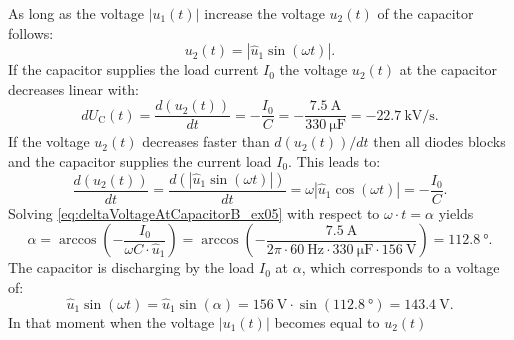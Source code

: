 \begin{solutionblock}
    As long as the voltage $\left| u_\mathrm{1}(t) \right|$ increase the voltage $u_\mathrm{2}(t)$ of the capacitor follows:
    \begin{equation} 
        u_\mathrm{2}(t) = \left| \hat{u}_\mathrm{1}\sin(\omega t)\right|.
    \end{equation}
    If the capacitor supplies the load current $I_\mathrm{0}$ the voltage $u_\mathrm{2}(t)$ at the capacitor 
    decreases linear with:
    \begin{equation} 
        dU_\mathrm{C}(t)=\frac{d(u_\mathrm{2}(t))}{dt} = -\frac{I_\mathrm{0}}{C}=-\frac{\SI{7.5}{\ampere}}{\SI{330}{\micro\farad}}
        =-\SI{22.7}{\kilo\volt/\second}.
        \label{eq:deltaVoltageAtCapacitorA_ex05}
    \end{equation} 
    If the voltage $u_\mathrm{2}(t)$ decreases faster than $d(u_\mathrm{2}(t))/dt$
    then all diodes blocks and the capacitor supplies the current load $I_\mathrm{0}$. This leads to:
    \begin{equation} 
        \frac{d(u_\mathrm{2}(t))}{dt} = \frac{d(\left| \hat{u}_\mathrm{1}\sin(\omega t)\right|)}{dt} 
        = \omega\left| \hat{u}_\mathrm{1}\cos(\omega t)\right| = -\frac{I_\mathrm{0}}{C}.
        \label{eq:deltaVoltageAtCapacitorB_ex05}
    \end{equation} 
    Solving \eqref{eq:deltaVoltageAtCapacitorB_ex05} with respect to $\omega \cdot t = \alpha$ yields
    \begin{equation}
        \alpha = \arccos(-\frac{I_\mathrm{0}}{\omega C \cdot \hat{u}_\mathrm{1}})
        = \arccos(-\frac{\SI{7.5}{\ampere}}{2 \pi \cdot \SI{60}{\hertz} \cdot \SI{330}{\micro\farad} \cdot \SI{156}{\volt}}) = \SI{112.8}{\degree}.
    \end{equation}
    The capacitor is discharging by the load  $I_\mathrm{0}$ at $\alpha$, which corresponds to a 
    voltage of: 
    \begin{equation}
        \hat{u}_\mathrm{1}\sin(\omega t) = \hat{u}_\mathrm{1}\sin(\alpha) 
        = \SI{156}{\volt} \cdot \sin(\SI{112.8}{\degree})=\SI{143.4}{\volt}.
    \end{equation}    
    In that moment when the voltage $\left| u_\mathrm{1}(t) \right|$ becomes equal to $u_\mathrm{2}(t)$ 

\end{solutionblock}
